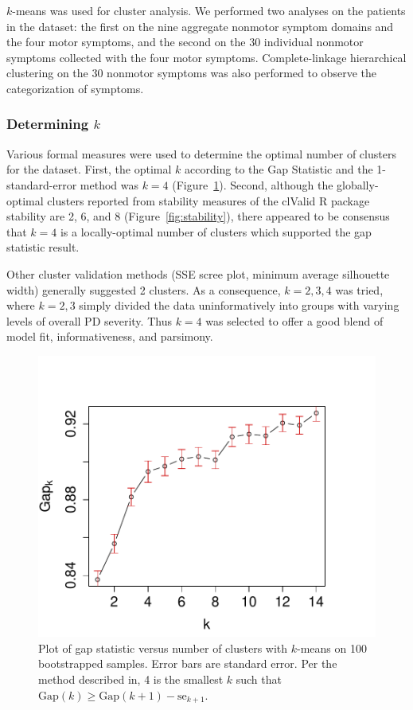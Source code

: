 \documentclass[preprint,3p,twocolumn]{elsarticle} %
\begin{document}
$k$-means was used for cluster analysis. We performed two analyses on the
patients in the dataset: the first on the nine aggregate nonmotor symptom
domains and the four motor symptoms, and the second on the 30 individual
nonmotor symptoms collected with the four motor symptoms. Complete-linkage
hierarchical clustering on the 30 nonmotor symptoms was also performed to observe the
categorization of symptoms.

\subsubsection{Determining $k$}

Various formal measures were used to determine the optimal number of
clusters for the dataset. First, the optimal $k$ according to the Gap Statistic and the
1-standard-error method\cite{tibshirani01gap} was $k = 4$ (Figure~\ref{fig:gap}). Second, although
the globally-optimal clusters reported from stability measures of the clValid R package
\cite{brock11clvalid} stability are 2, 6, and 8 (Figure~\ref{fig:stability}), there appeared to be
consensus that $k = 4$ is a locally-optimal number of clusters which supported the gap statistic
result.

Other cluster validation methods (SSE scree plot, minimum average silhouette width) generally
suggested 2 clusters. As a consequence, $k = 2, 3, 4$ was tried, where $k = 2, 3$ simply divided
the data uninformatively into groups with varying levels of overall PD severity. Thus $k = 4$ was
selected to offer a good blend of model fit, informativeness, and parsimony.

\begin{figure}[h]
  \centering
  \includegraphics[width=\linewidth]{gap-statistic.pdf}
  \caption{Plot of gap statistic versus number of clusters with $k$-means on 100 bootstrapped
    samples. Error bars are standard error. Per the method described in\cite{tibshirani01gap}, 4 is the smallest $k$ such
    that $\text{Gap}(k) \geq \text{Gap}(k + 1) - \text{se}_{k + 1}$.}
  \label{fig:gap}
\end{figure}
\end{document}

